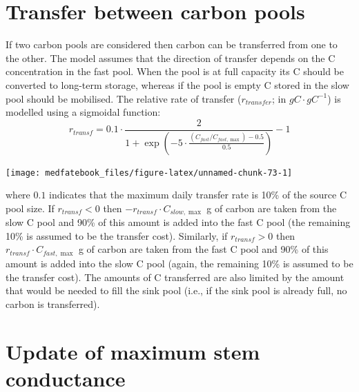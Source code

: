 \documentclass[]{book}
\begin{document}
\hypertarget{transfer-between-carbon-pools}{%
\section{Transfer between carbon pools}\label{transfer-between-carbon-pools}}

If two carbon pools are considered then carbon can be transferred from one to the other. The model assumes that the direction of transfer depends on the C concentration in the fast pool. When the pool is at full capacity its C should be converted to long-term storage, whereas if the pool is empty C stored in the slow pool should be mobilised. The relative rate of transfer (\(r_{transfer}\); in \(g C·g C^{-1}\)) is modelled using a sigmoidal function:
\begin{equation}
r_{transf} = 0.1 \cdot \frac{2}{1+\exp \left(-5 \cdot \frac{(C_{fast}/C_{fast, \max})-0.5}{0.5}\right)}-1
\end{equation}

\begin{center}\texttt{[image: medfatebook\_files/figure-latex/unnamed-chunk-73-1]} \end{center}

where \(0.1\) indicates that the maximum daily transfer rate is 10\% of the source C pool size. If \(r_{transf}<0\) then \(-r_{transf} \cdot C_{slow, \max}\) g of carbon are taken from the slow C pool and 90\% of this amount is added into the fast C pool (the remaining 10\% is assumed to be the transfer cost). Similarly, if \(r_{transf}>0\) then \(r_{transf} \cdot C_{fast, \max}\) g of carbon are taken from the fast C pool and 90\% of this amount is added into the slow C pool (again, the remaining 10\% is assumed to be the transfer cost). The amounts of C transferred are also limited by the amount that would be needed to fill the sink pool (i.e., if the sink pool is already full, no carbon is transferred).

\hypertarget{update-of-maximum-stem-conductance}{%
\section{Update of maximum stem conductance}\label{update-of-maximum-stem-conductance}}
\end{document}
